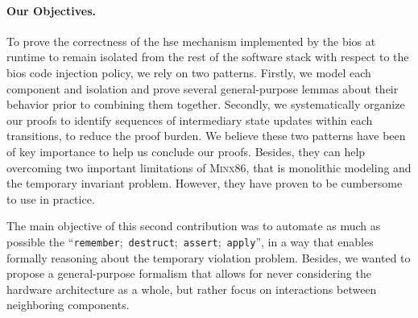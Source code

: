 \paragraph{Our Objectives.}
%
To prove the correctness of the \ac{hse} mechanism implemented by the \ac{bios}
at runtime to remain isolated from the rest of the software stack with respect
to the \ac{bios} code injection policy, we rely on two patterns.
%
Firstly, we model each component and isolation and prove several general-purpose
lemmas about their behavior prior to combining them together.
%
Secondly, we systematically organize our proofs to identify sequences of
intermediary state updates within each transitions, to reduce the proof burden.
%
We believe these two patterns have been of key importance to help us conclude
our proofs.
%
Besides, they can help overcoming two important limitations of {\scshape
  Minx86}, that is monolithic modeling and the temporary invariant problem.
%
However, they have proven to be cumbersome to use in practice.

The main objective of this second contribution was to automate as much as
possible the
``\texttt{remember};~\texttt{destruct};~\texttt{assert};~\texttt{apply}'', in a
way that enables formally reasoning about the temporary violation problem.
%
Besides, we wanted to propose a general-purpose formalism that allows for never
considering the hardware architecture as a whole, but rather focus on
interactions between neighboring components.

